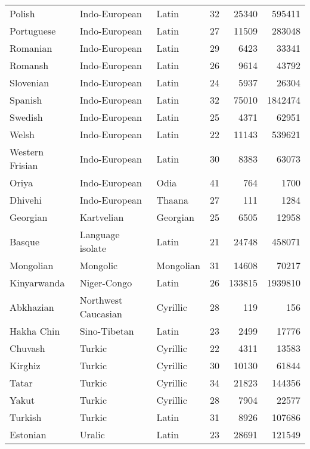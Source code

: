 \begin{table}[ht]
\begin{tabular}{lllrrr}
  Polish & Indo-European & Latin &  32 & 25340 & 595411 \\ 
  Portuguese & Indo-European & Latin &  27 & 11509 & 283048 \\ 
  Romanian & Indo-European & Latin &  29 & 6423 & 33341 \\ 
  Romansh & Indo-European & Latin &  26 & 9614 & 43792 \\ 
  Slovenian & Indo-European & Latin &  24 & 5937 & 26304 \\ 
  Spanish & Indo-European & Latin &  32 & 75010 & 1842474 \\ 
  Swedish & Indo-European & Latin &  25 & 4371 & 62951 \\ 
  Welsh & Indo-European & Latin &  22 & 11143 & 539621 \\ 
  Western Frisian & Indo-European & Latin &  30 & 8383 & 63073 \\ 
  Oriya & Indo-European & Odia &  41 & 764 & 1700 \\ 
  Dhivehi & Indo-European & Thaana &  27 & 111 & 1284 \\ 
  Georgian & Kartvelian & Georgian &  25 & 6505 & 12958 \\ 
  Basque & Language isolate & Latin &  21 & 24748 & 458071 \\ 
  Mongolian & Mongolic & Mongolian &  31 & 14608 & 70217 \\ 
  Kinyarwanda & Niger-Congo & Latin &  26 & 133815 & 1939810 \\ 
  Abkhazian & Northwest Caucasian & Cyrillic &  28 & 119 & 156 \\ 
  Hakha Chin & Sino-Tibetan & Latin &  23 & 2499 & 17776 \\ 
  Chuvash & Turkic & Cyrillic &  22 & 4311 & 13583 \\ 
  Kirghiz & Turkic & Cyrillic &  30 & 10130 & 61844 \\ 
  Tatar & Turkic & Cyrillic &  34 & 21823 & 144356 \\ 
  Yakut & Turkic & Cyrillic &  28 & 7904 & 22577 \\ 
  Turkish & Turkic & Latin &  31 & 8926 & 107686 \\ 
  Estonian & Uralic & Latin &  23 & 28691 & 121549 \\ 
   \hline
\end{tabular}
\end{table}
